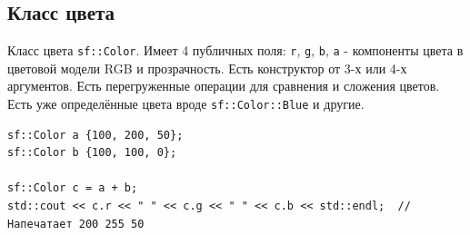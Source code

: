\documentclass{article}
\begin{document}
\subsection*{Класс цвета}
Класс цвета \texttt{sf::Color}. Имеет 4 публичных поля: \texttt{r}, \texttt{g}, \texttt{b}, \texttt{a} - компоненты цвета в цветовой модели RGB и прозрачность. Есть конструктор от 3-х или 4-х аргументов. Есть перегруженные операции для сравнения и сложения цветов. Есть уже определённые цвета вроде \texttt{sf::Color::Blue} и другие.

\begin{lstlisting}
sf::Color a {100, 200, 50};
sf::Color b {100, 100, 0};

sf::Color c = a + b;
std::cout << c.r << " " << c.g << " " << c.b << std::endl;  // Напечатает 200 255 50
\end{lstlisting}
\end{document}
